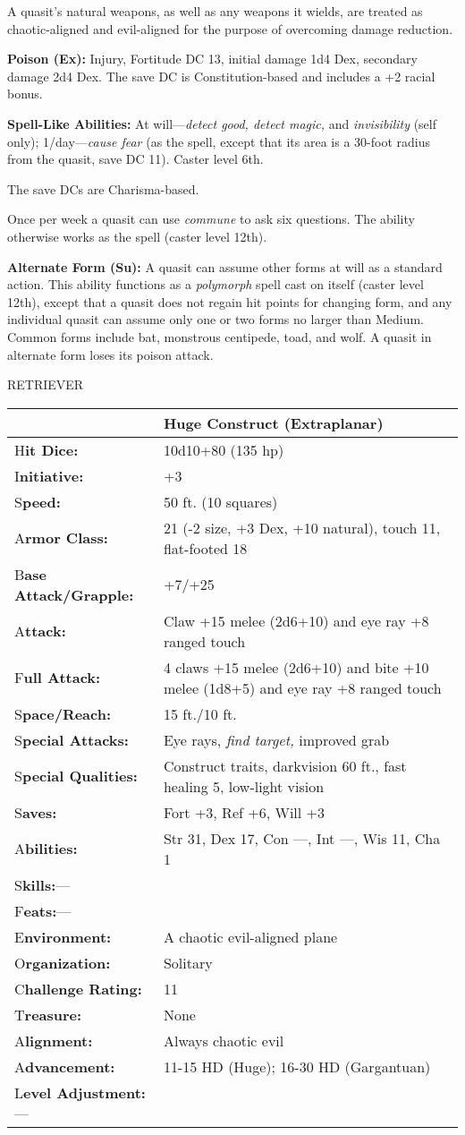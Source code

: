 \documentclass{article}
\begin{document}
A quasit's natural weapons, as well as any weapons it wields, are treated as chaotic-aligned 
and evil-aligned for the purpose of overcoming damage reduction.

\textbf{Poison (Ex): }Injury, Fortitude DC 13, initial damage 1d4 Dex, secondary 
damage 2d4 Dex. The save DC is Constitution-based and includes a +2 racial bonus.

\textbf{Spell-Like Abilities: }At will---\textit{detect good, detect magic, }and 
\textit{invisibility }(self only); 1/day---\textit{cause fear }(as the spell, except 
that its area is a 30-foot radius from the quasit, save DC 11). Caster level 6th.

The save DCs are Charisma-based.

Once per week a quasit can use \textit{commune }to ask six questions. The ability 
otherwise works as the spell (caster level 12th).

\textbf{Alternate Form (Su): }A quasit can assume other forms at will as a standard 
action. This ability functions as a \textit{polymorph }spell cast on itself (caster 
level 12th), except that a quasit does not regain hit points for changing form, 
and any individual quasit can assume only one or two forms no larger than Medium. 
Common forms include bat, monstrous centipede, toad, and wolf. A quasit in alternate 
form loses its poison attack.

\vspace{12pt}
RETRIEVER

\begin{tabular}{|>{\raggedright}p{91pt}|>{\raggedright}p{231pt}|}
\hline
  & Huge Construct (Extraplanar)\tabularnewline
\hline
H\textbf{it Dice:} & 10d10+80 (135 hp)\tabularnewline
\hline
I\textbf{nitiative:} & +3\tabularnewline
\hline
S\textbf{peed:} & 50 ft. (10 squares)\tabularnewline
\hline
A\textbf{rmor Class:} & 21 (-2 size, +3 Dex, +10 natural), touch 11, flat-footed 
18\tabularnewline
\hline
B\textbf{ase Attack/Grapple:} & +7/+25\tabularnewline
\hline
A\textbf{ttack:} & Claw +15 melee (2d6+10) and eye ray +8 ranged touch\tabularnewline
\hline
F\textbf{ull Attack:} & 4 claws +15 melee (2d6+10) and bite +10 melee (1d8+5) and 
eye ray +8 ranged touch\tabularnewline
\hline
S\textbf{pace/Reach:} & 15 ft./10 ft.\tabularnewline
\hline
S\textbf{pecial Attacks:} & Eye rays, \textit{find target, }improved grab\tabularnewline
\hline
S\textbf{pecial Qualities:} & Construct traits, darkvision 60 ft., fast healing 
5, low-light vision\tabularnewline
\hline
S\textbf{aves:} & Fort +3, Ref +6, Will +3\tabularnewline
\hline
A\textbf{bilities:} & Str 31, Dex 17, Con ---, Int ---, Wis 11, Cha 1\tabularnewline
\hline
S\textbf{kills:}--- & \tabularnewline
\hline
F\textbf{eats:}--- & \tabularnewline
\hline
E\textbf{nvironment:} & A chaotic evil-aligned plane\tabularnewline
\hline
O\textbf{rganization:} & Solitary\tabularnewline
\hline
C\textbf{hallenge Rating:} & 11\tabularnewline
\hline
T\textbf{reasure:} & None\tabularnewline
\hline
A\textbf{lignment:} & Always chaotic evil\tabularnewline
\hline
A\textbf{dvancement:} & 11-15 HD (Huge); 16-30 HD (Gargantuan)\tabularnewline
\hline
L\textbf{evel Adjustment:}--- & \tabularnewline
\hline
\end{tabular}
\end{document}
